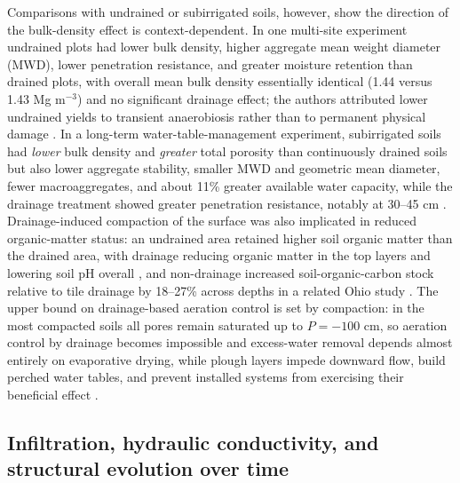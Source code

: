 \documentclass[11pt]{article}
\begin{document}
Comparisons with undrained or subirrigated soils, however, show the direction of the
bulk-density effect is context-dependent. In one multi-site experiment undrained
plots had lower bulk density, higher aggregate mean weight diameter (MWD), lower
penetration resistance, and greater moisture retention than drained plots, with
overall mean bulk density essentially identical (1.44 versus 1.43 Mg m$^{-3}$) and no
significant drainage effect; the authors attributed lower undrained yields to
transient anaerobiosis rather than to permanent physical damage
\parencite{LAL1993}. In a long-term water-table-management experiment, subirrigated
soils had \textit{lower} bulk density and \textit{greater} total porosity than
continuously drained soils but also lower aggregate stability, smaller MWD and
geometric mean diameter, fewer macroaggregates, and about 11\% greater available
water capacity, while the drainage treatment showed greater penetration resistance,
notably at 30--45 cm \parencite{Baker2004}. Drainage-induced compaction of the surface
was also implicated in reduced organic-matter status: an undrained area retained
higher soil organic matter than the drained area, with drainage reducing organic
matter in the top layers and lowering soil pH overall \parencite{FAUSEY1992}, and
non-drainage increased soil-organic-carbon stock relative to tile drainage by
18--27\% across depths in a related Ohio study \parencite{Kumar2014}. The upper bound
on drainage-based aeration control is set by compaction: in the most compacted soils
all pores remain saturated up to $P = -100$ cm, so aeration control by drainage
becomes impossible and excess-water removal depends almost entirely on evaporative
drying, while plough layers impede downward flow, build perched water tables, and
prevent installed systems from exercising their beneficial effect
\parencite{SMEDEMA1993}.

\subsection{Infiltration, hydraulic conductivity, and structural evolution over time}
\end{document}
